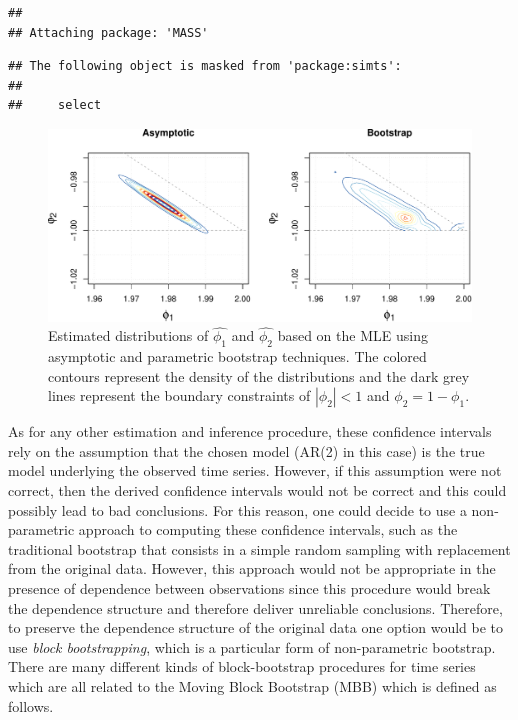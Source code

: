 \documentclass[]{book}
\theoremstyle{definition}
\theoremstyle{definition}
\theoremstyle{definition}
\theoremstyle{remark}
\begin{document}
\begin{verbatim}
## 
## Attaching package: 'MASS'
\end{verbatim}

\begin{verbatim}
## The following object is masked from 'package:simts':
## 
##     select
\end{verbatim}

\begin{figure}
\centering
\includegraphics{ts_files/figure-latex/ciAR2d-1.pdf}
\caption{\label{fig:ciAR2d}Estimated distributions of \(\hat{\phi_1}\) and
\(\hat{\phi_2}\) based on the MLE using asymptotic and parametric
bootstrap techniques. The colored contours represent the density of the
distributions and the dark grey lines represent the boundary constraints
of \(\left|\phi_2\right|<1\) and \(\phi_2 = 1 - \phi_1\).}
\end{figure}

As for any other estimation and inference procedure, these confidence
intervals rely on the assumption that the chosen model (AR(2) in this
case) is the true model underlying the observed time series. However, if
this assumption were not correct, then the derived confidence intervals
would not be correct and this could possibly lead to bad conclusions.
For this reason, one could decide to use a non-parametric approach to
computing these confidence intervals, such as the traditional bootstrap
that consists in a simple random sampling with replacement from the
original data. However, this approach would not be appropriate in the
presence of dependence between observations since this procedure would
break the dependence structure and therefore deliver unreliable
conclusions. Therefore, to preserve the dependence structure of the
original data one option would be to use \emph{block bootstrapping},
which is a particular form of non-parametric bootstrap. There are many
different kinds of block-bootstrap procedures for time series which are
all related to the Moving Block Bootstrap (MBB) which is defined as
follows.
\end{document}
